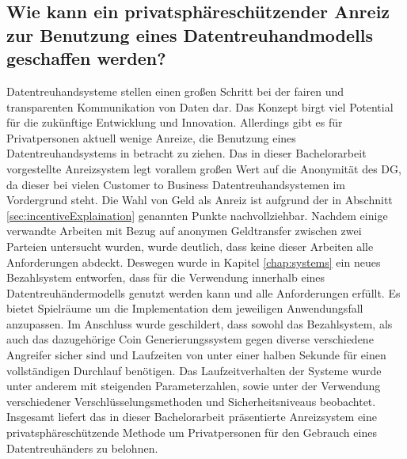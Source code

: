 \documentclass[
	fontsize=11pt,
	headings=small,
	parskip=half,           %
	bibliography=totoc,
	numbers=noenddot,       %
	open=any,               %
]{scrreprt}
\begin{document}
\subsection{Wie kann ein privatsphäreschützender Anreiz zur Benutzung eines Datentreuhandmodells geschaffen werden?}
Datentreuhandsysteme stellen einen großen Schritt bei der fairen und transparenten Kommunikation von Daten dar. Das Konzept birgt viel Potential für die zukünftige Entwicklung und Innovation. Allerdings gibt es für Privatpersonen aktuell wenige Anreize, die Benutzung eines Datentreuhandsystems in betracht zu ziehen. Das in dieser Bachelorarbeit vorgestellte Anreizsystem legt vorallem großen Wert auf die Anonymität des DG, da dieser bei vielen Customer to Business Datentreuhandsystemen im Vordergrund steht. Die Wahl von Geld als Anreiz ist aufgrund der in Abschnitt \ref{sec:incentiveExplaination} genannten Punkte nachvollziehbar. Nachdem einige verwandte Arbeiten mit Bezug auf anonymen Geldtransfer zwischen zwei Parteien untersucht wurden, wurde deutlich, dass keine dieser Arbeiten alle Anforderungen abdeckt. Deswegen wurde in Kapitel \ref{chap:systems} ein neues Bezahlsystem entworfen, dass für die Verwendung innerhalb eines Datentreuhändermodells genutzt werden kann und alle Anforderungen erfüllt. Es bietet Spielräume um die Implementation dem jeweiligen Anwendungsfall anzupassen. Im Anschluss wurde geschildert, dass sowohl das Bezahlsystem, als auch das dazugehörige Coin Generierungssystem gegen diverse verschiedene Angreifer sicher sind und Laufzeiten von unter einer halben Sekunde für einen vollständigen Durchlauf benötigen. Das Laufzeitverhalten der Systeme wurde unter anderem mit steigenden Parameterzahlen, sowie unter der Verwendung verschiedener Verschlüsselungsmethoden und Sicherheitsniveaus beobachtet. Insgesamt liefert das in dieser Bachelorarbeit präsentierte Anreizsystem eine privatsphäreschützende Methode um Privatpersonen für den Gebrauch eines Datentreuhänders zu belohnen.
\end{document}
